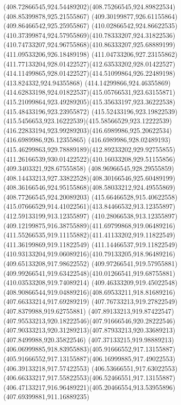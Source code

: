 {{{{				\curveto(408.72866545,924.54489202)(408.75266545,924.89822534)(408.85399878,925.21555867)
				\lineto(409.30199877,926.61155864)
				\lineto(409.86466542,925.25955867)
				\curveto(410.02866542,924.86622535)(410.37399874,924.57955869)(410.78333207,924.31822536)
				\curveto(410.74733207,924.96755868)(410.86333207,925.68889199)(411.09533206,926.18489198)
				\curveto(411.04733206,927.23155862)(411.77133204,928.01422527)(412.63533202,928.01422527)
				\curveto(414.11499865,928.01422527)(414.51099864,926.22489198)(413.824332,924.94355868)
				\curveto(414.14299866,924.46355869)(414.62833198,924.01822537)(415.05766531,923.63155871)
				\curveto(415.21099864,923.49289205)(415.35633197,923.36222538)(415.48433196,923.23955872)
				\curveto(415.52433196,923.19822539)(415.5456653,923.16222539)(415.58566529,923.12222539)
				\curveto(416.22833194,923.99289203)(416.6989986,925.20622534)(416.6989986,926.12355865)
				\curveto(416.6989986,928.02489193)(415.46299863,929.78889189)(412.89233202,929.92755855)
				\curveto(411.26166539,930.01422522)(410.16033208,929.51155856)(409.3403321,928.67555858)
				\curveto(408.96966545,928.29555859)(408.14433213,927.33822528)(408.30166546,925.60489199)
				\curveto(408.36166546,924.95155868)(408.58033212,924.49555869)(408.77266545,924.20089203)
				\moveto(415.66466528,915.40622558)
				\curveto(415.07666529,914.41022561)(413.84466532,913.12355897)(412.59133199,913.12355897)
				\curveto(410.28066538,913.12355897)(409.12199875,916.38755889)(411.69799868,919.06489216)
				\curveto(411.55266535,919.11155882)(411.41133202,919.11822549)(411.36199869,919.11822549)
				\curveto(411.14466537,919.11822549)(410.93133204,919.06089216)(410.79133205,918.96489216)
				\lineto(409.65133208,917.98622552)
				\lineto(409.97266541,919.57955881)
				\curveto(409.99266541,919.63422548)(410.01266541,919.68755881)(410.03533208,919.74089214)
				\curveto(409.46333209,919.45022548)(408.90866544,919.04889216)(408.69533211,918.81689216)
				\lineto(407.66333214,917.69289219)
				\lineto(407.76733213,919.27822549)
				\lineto(407.8379988,919.62755881)
				\curveto(407.89133213,919.87422547)(407.95533213,920.18222546)(407.91666546,920.28222546)
				\curveto(407.90333213,920.31289213)(407.87933213,920.33689213)(407.8499988,920.35822546)
				\curveto(407.37133215,919.98889213)(406.06999885,918.83955883)(405.91666552,917.13155887)
				\curveto(405.91666552,917.13155887)(406.16999885,917.49022553)(406.39133218,917.57422553)
				\curveto(406.53666551,917.63022553)(406.66333217,917.55822553)(406.52466551,917.13155887)
				\curveto(406.47133217,916.96489221)(405.20466554,913.53955896)(407.69399881,911.16889235)
}}}}
